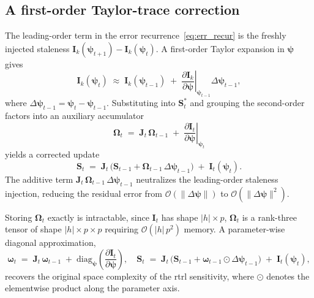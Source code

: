 \documentclass{article}
\begin{document}
\subsection{A first-order Taylor-trace correction}
\label{sec:staleness-correction}

The leading-order term in the error recurrence~\eqref{eq:err_recur} is
the freshly injected staleness
$\boldsymbol{I}_k(\boldsymbol{\psi}_{t+1}) - \boldsymbol{I}_k(\boldsymbol{\psi}_t)$. A first-order Taylor expansion in
$\boldsymbol{\psi}$ gives
\begin{equation}
    \boldsymbol{I}_k(\boldsymbol{\psi}_t) \;\approx\; \boldsymbol{I}_k(\boldsymbol{\psi}_{t-1})
    \;+\; \left.\frac{\partial \boldsymbol{I}_k}{\partial \boldsymbol{\psi}}\right|_{\boldsymbol{\psi}_{t-1}}\!\!
    \Delta\boldsymbol{\psi}_{t-1},
\end{equation}
where $\Delta\boldsymbol{\psi}_{t-1} = \boldsymbol{\psi}_t - \boldsymbol{\psi}_{t-1}$. Substituting into
$\boldsymbol{S}_t^\ast$ and grouping the second-order factors into an auxiliary
accumulator
\begin{equation}
    \boldsymbol{\Omega}_t \;=\; \boldsymbol{J}_t\, \boldsymbol{\Omega}_{t-1}
    \;+\; \left.\frac{\partial \boldsymbol{I}_t}{\partial \boldsymbol{\psi}}\right|_{\boldsymbol{\psi}_t}
\end{equation}
yields a corrected update
\begin{equation}
    \boldsymbol{S}_t \;=\; \boldsymbol{J}_t\,\bigl(\boldsymbol{S}_{t-1} + \boldsymbol{\Omega}_{t-1}\, \Delta\boldsymbol{\psi}_{t-1}\bigr)
    \;+\; \boldsymbol{I}_t(\boldsymbol{\psi}_t).
\end{equation}
The additive term $\boldsymbol{J}_t\, \boldsymbol{\Omega}_{t-1}\, \Delta\boldsymbol{\psi}_{t-1}$ neutralizes
the leading-order staleness injection, reducing the residual error from
$\mathcal{O}(\|\Delta\boldsymbol{\psi}\|)$ to $\mathcal{O}(\|\Delta\boldsymbol{\psi}\|^2)$.

Storing $\boldsymbol{\Omega}_t$ exactly is intractable, since $\boldsymbol{I}_t$ has shape
$|h| \times p$, $\boldsymbol{\Omega}_t$ is a rank-three tensor of shape
$|h| \times p \times p$ requiring $\mathcal{O}(|h|\, p^2)$ memory. A
parameter-wise diagonal approximation,
\begin{equation}
    \boldsymbol{\omega}_t \;=\; \boldsymbol{J}_t\, \boldsymbol{\omega}_{t-1}
    \;+\; \mathrm{diag}_{\boldsymbol{\psi}}\!\left(\frac{\partial \boldsymbol{I}_t}{\partial \boldsymbol{\psi}}\right),
    \quad
    \boldsymbol{S}_t \;=\; \boldsymbol{J}_t\,\bigl(\boldsymbol{S}_{t-1} + \boldsymbol{\omega}_{t-1} \odot \Delta\boldsymbol{\psi}_{t-1}\bigr)
    \;+\; \boldsymbol{I}_t(\boldsymbol{\psi}_t),
    \label{eq:taylor-diag}
\end{equation}
recovers the original space complexity of the \gls{rtrl} sensitivity,
where $\odot$ denotes the elementwise product along the parameter axis.
\end{document}
